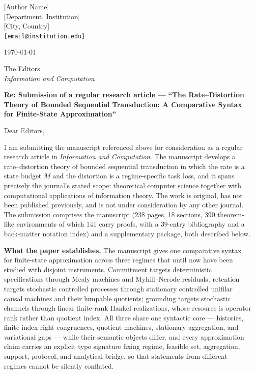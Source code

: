 \documentclass[11pt,a4paper]{article}
\begin{document}
[Author Name]\\
{}[Department, Institution]\\
{}[City, Country]\\
{}\texttt{[email@institution.edu]}

\hfill\today

\bigskip

The Editors\\
\emph{Information and Computation}

\bigskip

\textbf{Re: Submission of a regular research article --- ``The
Rate--Distortion Theory of Bounded Sequential Transduction: A Comparative
Syntax for Finite-State Approximation''}

\medskip

Dear Editors,

I am submitting the manuscript referenced above for consideration as a
regular research article in \emph{Information and Computation}. The
manuscript develops a rate--distortion theory of bounded sequential
transduction in which the rate is a state budget $M$ and the distortion is a
regime-specific task loss, and it spans precisely the journal's stated scope:
theoretical computer science together with computational applications of
information theory. The work is original, has not been published previously,
and is not under consideration by any other journal. The submission comprises
the manuscript (238 pages, 18 sections, 390 theorem-like environments of
which 141 carry proofs, with a 39-entry bibliography and a back-matter
notation index) and a supplementary package, both described below.

\textbf{What the paper establishes.} The manuscript gives one comparative
syntax for finite-state approximation across three regimes that until now
have been studied with disjoint instruments. Commitment targets deterministic
specifications through Mealy machines and Myhill--Nerode residuals; retention
targets stochastic controlled processes through stationary controlled
unifilar causal machines and their lumpable quotients; grounding targets
stochastic channels through linear finite-rank Hankel realizations, whose
resource is operator rank rather than quotient index. All three share one
syntactic core --- histories, finite-index right congruences, quotient
machines, stationary aggregation, and variational gaps --- while their
semantic objects differ, and every approximation claim carries an explicit
type signature fixing regime, feasible set, aggregation, support, protocol,
and analytical bridge, so that statements from different regimes cannot be
silently conflated.
\end{document}
